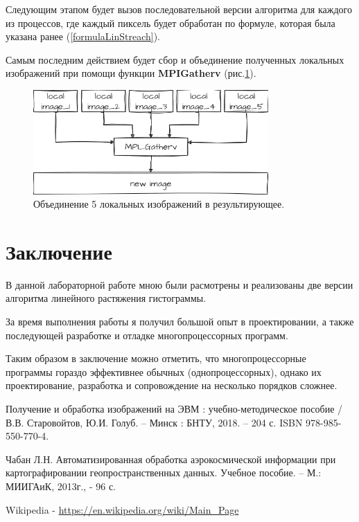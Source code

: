 \documentclass[a4paper,12pt]{article}
\begin{document}
\vspace{5mm}

Следующим этапом будет вызов последовательной версии алгоритма для каждого из процессов, где каждый пиксель будет обработан по формуле, которая была указана ранее (\ref{formulaLinStreach}).

\vspace{2cm}

Самым последним действием будет сбор и объединение полученных локальных изображений при помощи функции \textbf{MPI\textunderscore Gatherv} (рис.\ref{fig:gatherv}).

\vspace{5mm}

\begin{figure}[h!]
\centering
\includegraphics[width=0.8\textwidth]{images/gatherv.png}
\caption{Объединение 5 локальных изображений в результирующее.}
\label{fig:gatherv}
\end{figure}


\section*{Заключение}

В данной лабораторной работе мною были расмотрены и реализованы две версии алгоритма линейного растяжения гистограммы.\newline

За время выполнения работы я получил большой опыт в проектировании, а также последующей разработке и отладке многопроцессорных программ.\newline

Таким образом в заключение можно отметить, что многопроцессорные программы гораздо эффективнее обычных (однопроцессорных), однако их проектирование, разработка и сопровождение на несколько порядков сложнее.

\begin{thebibliography}{99}
    
    Получение и обработка изображений на ЭВМ : учебно-методическое пособие / В.В. Старовойтов, Ю.И. Голуб. – Минск : БНТУ, 2018. – 204 с. ISBN 978-985-550-770-4. 
    
    Чабан Л.Н. Автоматизированная обработка аэрокосмической информации при картографировании геопространственных данных. Учебное пособие. – М.: МИИГАиК, 2013г., - 96 с.
    
    Wikipedia - \url{https://en.wikipedia.org/wiki/Main_Page}
    \end{thebibliography}
    
\end{document}
